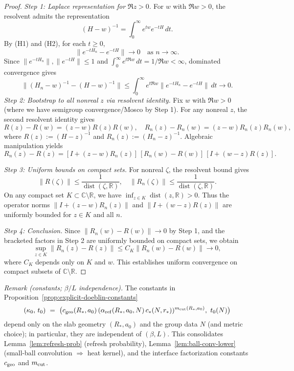 \documentclass[11pt]{amsart}
\theoremstyle{plain}
\theoremstyle{definition}
\theoremstyle{remark}
\begin{document}
\begin{proof}
\emph{Step 1: Laplace representation for $\Re z > 0$.} For $w$ with $\Re w > 0$, the resolvent admits the representation
\[
  (H-w)^{-1} = \int_0^\infty e^{tw} e^{-tH}\,dt.
\]
By (H1) and (H2), for each $t \ge 0$,
\[
  \|e^{-tH_n} - e^{-tH}\| \to 0 \quad \text{as } n \to \infty.
\]
Since $\|e^{-tH_n}\|, \|e^{-tH}\| \le 1$ and $\int_0^\infty e^{t\Re w}\,dt = 1/\Re w < \infty$, dominated convergence gives
\[
  \|(H_n-w)^{-1} - (H-w)^{-1}\| \le \int_0^\infty e^{t\Re w} \|e^{-tH_n} - e^{-tH}\|\,dt \to 0.
\]
\emph{Step 2: Bootstrap to all nonreal $z$ via resolvent identity.} Fix $w$ with $\Re w > 0$ (where we have semigroup convergence/Mosco by Step 1). For any nonreal $z$, the second resolvent identity gives
\[
  R(z) - R(w) = (z-w)R(z)R(w), \quad R_n(z) - R_n(w) = (z-w)R_n(z)R_n(w),
\]
where $R(z) := (H-z)^{-1}$ and $R_n(z) := (H_n-z)^{-1}$. Algebraic manipulation yields
\[
  R_n(z) - R(z) = [I + (z-w)R_n(z)]\,[R_n(w) - R(w)]\,[I + (w-z)R(z)].
\]

\emph{Step 3: Uniform bounds on compact sets.} For nonreal $\zeta$, the resolvent bound gives
\[
  \|R(\zeta)\| \le \frac{1}{\operatorname{dist}(\zeta,\mathbb{R})}, \quad \|R_n(\zeta)\| \le \frac{1}{\operatorname{dist}(\zeta,\mathbb{R})}.
\]
On any compact set $K \subset \mathbb{C} \setminus \mathbb{R}$, we have $\inf_{z \in K} \operatorname{dist}(z,\mathbb{R}) > 0$. Thus the operator norms $\|I + (z-w)R_n(z)\|$ and $\|I + (w-z)R(z)\|$ are uniformly bounded for $z \in K$ and all $n$.

\emph{Step 4: Conclusion.} Since $\|R_n(w) - R(w)\| \to 0$ by Step 1, and the bracketed factors in Step 2 are uniformly bounded on compact sets, we obtain
\[
  \sup_{z \in K} \|R_n(z) - R(z)\| \le C_K \|R_n(w) - R(w)\| \to 0,
\]
where $C_K$ depends only on $K$ and $w$. This establishes uniform convergence on compact subsets of $\mathbb{C} \setminus \mathbb{R}$.
\end{proof}

\noindent\emph{Remark (constants; $\beta/L$ independence).} The constants in Proposition~\ref{prop:explicit-doeblin-constants}
\[
  (\kappa_0,\,t_0)\ =\ \big(c_{\rm geo}(R_*,a_0)\,(\alpha_{\rm ref}(R_*,a_0,N)\,c_*(N,r_*))^{m_{\rm cut}(R_*,a_0)},\ t_0(N)\big)
\]
depend only on the slab geometry $(R_*,a_0)$ and the group data $N$ (and metric choice); in particular, they are independent of $(\beta,L)$. This consolidates Lemma~\ref{lem:refresh-prob} (refresh probability), Lemma~\ref{lem:ball-conv-lower} (small-ball convolution $\Rightarrow$ heat kernel), and the interface factorization constants $c_{\rm geo}$ and $m_{\rm cut}$.
\end{document}
